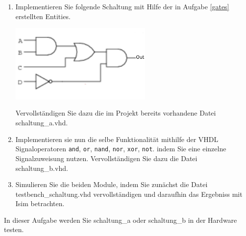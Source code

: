 \documentclass[12pt]{article}
\begin{document}
\begin{enumerate}[label=\alph*.)]


\item Implementieren Sie folgende Schaltung mit Hilfe der in
  Aufgabe \ref{gates} erstellten Entities.
  \begin{center}
    \includegraphics[width= 7cm]{./images/01301x01}
  \end{center}
\vspace*{-25pt}
Vervollständigen Sie dazu die im Projekt bereits vorhandene Datei schaltung\_a.vhd.


\item Implementieren sie nun die selbe Funktionalität mithilfe der VHDL Signaloperatoren
  \texttt{and}, \texttt{or}, \texttt{nand}, \texttt{nor}, \texttt{xor}, \texttt{not}.
 indem Sie eine einzelne Signalzuweisung nutzen.
 Vervollständigen Sie dazu die Datei schaltung\_b.vhd.


\item Simulieren Sie die beiden Module, indem Sie zunächst die Datei testbench\_schaltung.vhd
vervollständigen und daraufhin das Ergebniss mit Isim betrachten.


\end{enumerate}







In dieser Aufgabe werden Sie schaltung\_a oder schaltung\_b in der Hardware testen.
\end{document}
